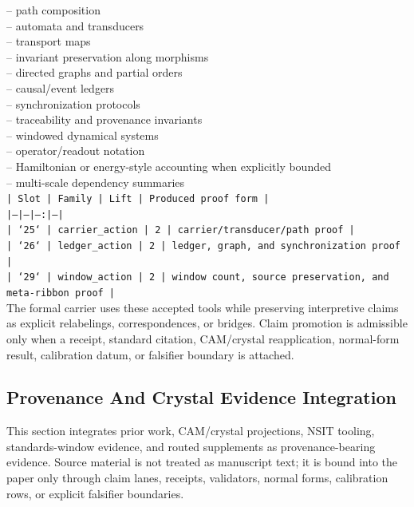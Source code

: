 \documentclass[11pt]{article}
\begin{document}
\noindent{}-- path composition\\
\noindent{}-- automata and transducers\\
\noindent{}-- transport maps\\
\noindent{}-- invariant preservation along morphisms\\
\noindent{}-- directed graphs and partial orders\\
\noindent{}-- causal/event ledgers\\
\noindent{}-- synchronization protocols\\
\noindent{}-- traceability and provenance invariants\\
\noindent{}-- windowed dynamical systems\\
\noindent{}-- operator/readout notation\\
\noindent{}-- Hamiltonian or energy-style accounting when explicitly bounded\\
\noindent{}-- multi-scale dependency summaries\\

\noindent\texttt{| Slot | Family | Lift | Produced proof form |}\\
\noindent\texttt{|---|---|---:|---|}\\
\noindent\texttt{| `25` | carrier\_action | 2 | carrier/transducer/path proof |}\\
\noindent\texttt{| `26` | ledger\_action | 2 | ledger, graph, and synchronization proof |}\\
\noindent\texttt{| `29` | window\_action | 2 | window count, source preservation, and meta-ribbon proof |}\\

The formal carrier uses these accepted tools while preserving interpretive
claims as explicit relabelings, correspondences, or bridges. Claim promotion is admissible only when a receipt, standard citation,
CAM/crystal reapplication, normal-form result, calibration datum, or falsifier
boundary is attached.

\subsection*{Provenance And Crystal Evidence Integration}

This section integrates prior work, CAM/crystal projections, NSIT tooling,
standards-window evidence, and routed supplements as provenance-bearing
evidence. Source material is not treated as manuscript text; it is bound into
the paper only through claim lanes, receipts, validators, normal forms,
calibration rows, or explicit falsifier boundaries.
\end{document}
